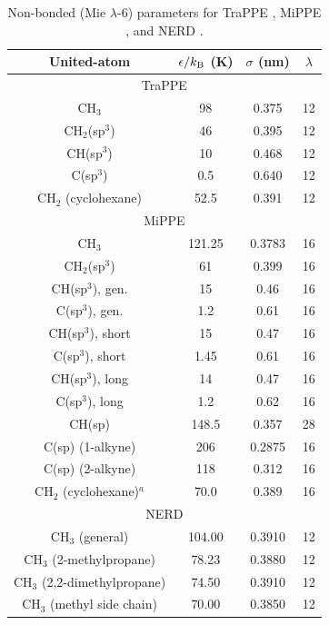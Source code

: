 \documentclass[journal=jced,manuscript=article]{achemso}
\begin{document}
    \begin{table}[h!]
		\caption{Non-bonded (Mie $\lambda$-6) parameters for TraPPE \cite{TraPPE,Martin1999,Keasler2012}, MiPPE \cite{Mie,Potoff_branched,Barhaghi2017}, and NERD \cite{NERD,Nath2001}.} \label{tab:nonbonded params}
		\begin{center}
			\begin{tabular}{|c|c|c|c|}
				\hline
				United-atom & $\epsilon/k_{\rm B}$ (K) & $\sigma$ (nm) & $\lambda$ \\ \hline
				\multicolumn{4}{|c|}{TraPPE} \\ \hline
				CH$_3$ & 98 & 0.375 & 12 \\ 
				CH$_2$(sp$^3$) & 46 & 0.395 & 12\\ 
				CH(sp$^3$) & 10 & 0.468 & 12 \\
				C(sp$^3$) & 0.5 & 0.640 & 12 \\
				CH$_2$ (cyclohexane) & 52.5 & 0.391 & 12 \\
				\hline
				\multicolumn{4}{|c|}{MiPPE} \\ \hline
				CH$_3$ & 121.25 & 0.3783 & 16  \\ 
				CH$_2$(sp$^3$) & 61 & 0.399 & 16 \\ 
				CH(sp$^3$), gen. & 15 & 0.46 & 16\\
				C(sp$^3$), gen. & 1.2 & 0.61 & 16\\
				CH(sp$^3$), short & 15 & 0.47 & 16\\
				C(sp$^3$), short & 1.45 & 0.61 & 16\\
				CH(sp$^3$), long & 14 & 0.47 & 16\\
				C(sp$^3$), long & 1.2 & 0.62 & 16\\
				CH(sp) & 148.5 & 0.357 & 28\\
				C(sp) (1-alkyne) & 206 & 0.2875 & 16\\
				C(sp) (2-alkyne) & 118 & 0.312 & 16\\
				CH$_2$ (cyclohexane)$^a$ & 70.0 & 0.389 & 16 \\
				\hline
                \multicolumn{4}{|c|}{NERD} \\ \hline
				CH$_3$ (general) & 104.00  & 0.3910 & 12\\ 
				CH$_3$ (2-methylpropane) & 78.23  & 0.3880 & 12\\ 
				CH$_3$ (2,2-dimethylpropane) & 74.50  & 0.3910 & 12 \\  
				CH$_3$ (methyl side chain) & 70.00 & 0.3850 & 12 \\

\end{tabular}
\end{center}
\end{table}
\end{document}
